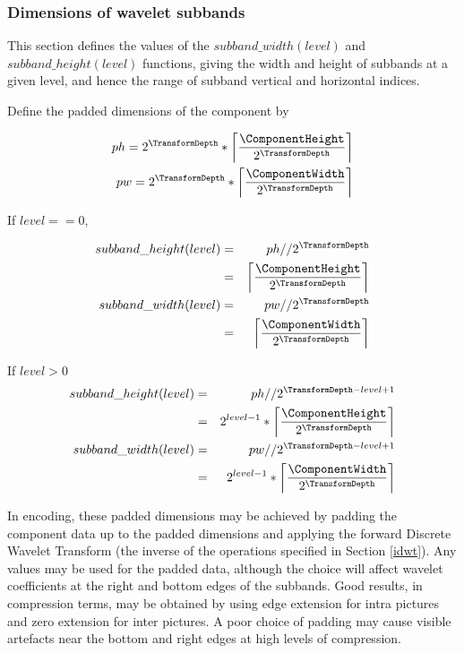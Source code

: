 \subsubsection{Dimensions of wavelet subbands}
\label{subbandwidthheight}

This section defines the values of the $subband\_width(level)$ and $subband\_height(level)$
functions, giving the width and height of subbands at a given level, and hence the range
of subband vertical and horizontal indices. 

Define the padded dimensions of the component by

\begin{eqnarray*}
ph = 2^{\TransformDepth}*\left\lceil\frac{\ComponentHeight}{2^{\TransformDepth}}\right\rceil \\
pw = 2^{\TransformDepth}*\left\lceil\frac{\ComponentWidth}{2^{\TransformDepth}}\right\rceil
\end{eqnarray*}

If $level==0$,

\begin{eqnarray*}
subband\_height(level) & = & ph//2^{\TransformDepth} \\
& = & \left\lceil\frac{\ComponentHeight}{2^{\TransformDepth}}\right\rceil \\
subband\_width(level) & = & pw//2^{\TransformDepth} \\
& = & \left\lceil\frac{\ComponentWidth}{2^{\TransformDepth}}\right\rceil
\end{eqnarray*}

If $level>0$
\begin{eqnarray*}
subband\_height(level) & = & ph//2^{\TransformDepth-level+1} \\
& = & 2^{level-1}*\left\lceil\frac{\ComponentHeight}{2^{\TransformDepth}}\right\rceil \\
subband\_width(level) & = & pw//2^{\TransformDepth-level+1} \\
& = & 2^{level-1}*\left\lceil \frac{\ComponentWidth}{2^{\TransformDepth}}\right\rceil
\end{eqnarray*}

\begin{informative}
In encoding, these padded dimensions may be achieved by padding the 
component data up to the padded dimensions and applying the forward
Discrete Wavelet Transform (the inverse of the operations specified in
Section \ref{idwt}). Any values may be used for the padded data, although
the choice will affect wavelet coefficients at the right and bottom 
edges of the subbands. Good results, in compression terms, may be obtained
 by using edge extension for intra pictures and zero extension for inter 
pictures. A poor choice of padding may cause visible artefacts near the
bottom and right edges at high levels of compression.
\end{informative}


